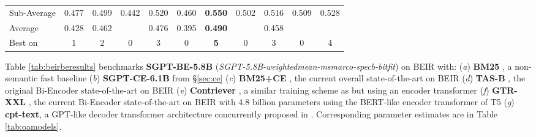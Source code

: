 \documentclass{article}
\begin{document}
\begin{table*}[t!]
{\begin{tabular}{l | c c | c | c c c | c c c c }
    Sub-Average & 0.477 & 0.499
    & 0.442
    & 0.520 & 0.460 & \textbf{0.550}
& 0.502 & 0.516 & 0.509 & 0.528
    \\
    Average & 0.428 & 0.462
    & 
    & 0.476 & 0.395 & \textbf{0.490}
& & 0.458 & &
    \\
    Best on & 1 & 2
    & 0
    & 3 & 0 & \textbf{5}
& 0 & 3 & 0 & 4
    \\
    \bottomrule
    \end{tabular}}
    \caption{Comparison of BEIR state-of-the-art models. Keep model size, latency and training time in mind when inspecting this table. Further, this table compares 2 Cross-Encoders and 8 Bi-Encoders, whose respective trade-offs should be considered.  Scores are \textbf{nDCG@10}. : In-domain performance.  : Results from \cite{thakur2021beir}. : Results from \cite{izacard2021towards}. : Results from \cite{ni2021large}. : Results from \cite{neelakantan2022text} except when marked with . Other scores are from us. Average scores do not include MS MARCO.}
    \label{tab:beirberesults}
\end{table*}

Table \ref{tab:beirberesults} benchmarks \textbf{SGPT-BE-5.8B} (\textit{SGPT-5.8B-weightedmean-msmarco-specb-bitfit}) on BEIR \cite{thakur2021beir} with: (\emph{a}) \textbf{BM25}  \cite{robertson2009probabilistic}, a non-semantic fast baseline (\emph{b}) \textbf{SGPT-CE-6.1B} from \S\ref{sec:ce} (\emph{c}) \textbf{BM25+CE} \cite{thakur2021beir}, the current overall state-of-the-art on BEIR (\emph{d}) \textbf{TAS-B} \cite{hofstatter2021efficiently}, the original Bi-Encoder state-of-the-art on BEIR (\emph{e}) \textbf{Contriever} \cite{izacard2021towards}, a similar training scheme as \cite{neelakantan2022text} but using an encoder transformer
(\emph{f}) \textbf{GTR-XXL} \cite{ni2021large}, the current Bi-Encoder state-of-the-art on BEIR with 4.8 billion parameters using the BERT-like encoder transformer of T5 \cite{raffel2019exploring}
(\emph{g}) \textbf{cpt-text}, a GPT-like decoder transformer architecture concurrently proposed in \cite{neelakantan2022text}. Corresponding parameter estimates are in Table \ref{tab:oamodels}.
\end{document}
